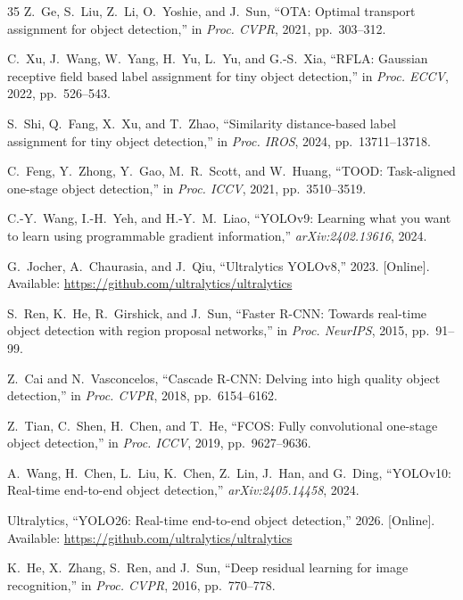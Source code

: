 \documentclass[11pt,a4paper]{article}
\begin{document}
\begin{thebibliography}{35}
  Z.~Ge, S.~Liu, Z.~Li, O.~Yoshie, and J.~Sun, ``OTA: Optimal transport assignment for object detection,'' in \emph{Proc. CVPR}, 2021, pp.~303--312.

  C.~Xu, J.~Wang, W.~Yang, H.~Yu, L.~Yu, and G.-S.~Xia, ``RFLA: Gaussian receptive field based label assignment for tiny object detection,'' in \emph{Proc. ECCV}, 2022, pp.~526--543.

  S.~Shi, Q.~Fang, X.~Xu, and T.~Zhao, ``Similarity distance-based label assignment for tiny object detection,'' in \emph{Proc. IROS}, 2024, pp.~13711--13718.

  C.~Feng, Y.~Zhong, Y.~Gao, M.~R.~Scott, and W.~Huang, ``TOOD: Task-aligned one-stage object detection,'' in \emph{Proc. ICCV}, 2021, pp.~3510--3519.

  C.-Y.~Wang, I.-H.~Yeh, and H.-Y.~M.~Liao, ``YOLOv9: Learning what you want to learn using programmable gradient information,'' \emph{arXiv:2402.13616}, 2024.

  G.~Jocher, A.~Chaurasia, and J.~Qiu, ``Ultralytics YOLOv8,'' 2023. [Online]. Available: \url{https://github.com/ultralytics/ultralytics}

  S.~Ren, K.~He, R.~Girshick, and J.~Sun, ``Faster R-CNN: Towards real-time object detection with region proposal networks,'' in \emph{Proc. NeurIPS}, 2015, pp.~91--99.

  Z.~Cai and N.~Vasconcelos, ``Cascade R-CNN: Delving into high quality object detection,'' in \emph{Proc. CVPR}, 2018, pp.~6154--6162.

  Z.~Tian, C.~Shen, H.~Chen, and T.~He, ``FCOS: Fully convolutional one-stage object detection,'' in \emph{Proc. ICCV}, 2019, pp.~9627--9636.

  A.~Wang, H.~Chen, L.~Liu, K.~Chen, Z.~Lin, J.~Han, and G.~Ding, ``YOLOv10: Real-time end-to-end object detection,'' \emph{arXiv:2405.14458}, 2024.

  Ultralytics, ``YOLO26: Real-time end-to-end object detection,'' 2026. [Online]. Available: \url{https://github.com/ultralytics/ultralytics}

  K.~He, X.~Zhang, S.~Ren, and J.~Sun, ``Deep residual learning for image recognition,'' in \emph{Proc. CVPR}, 2016, pp.~770--778.
\end{thebibliography}
\end{document}
